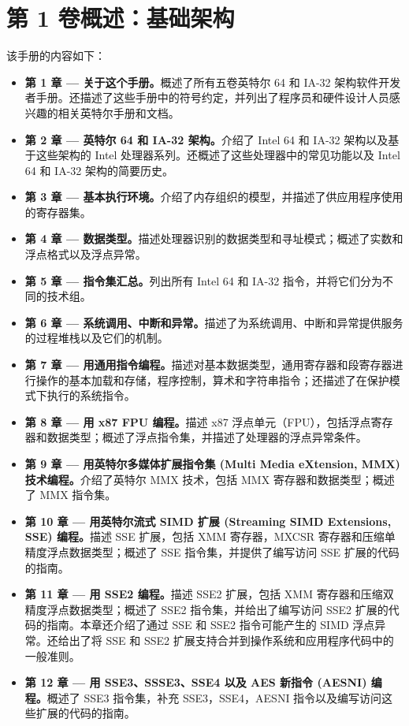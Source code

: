 \section{第 1 卷概述：基础架构}
该手册的内容如下：
\begin{itemize}
	\setlength\itemsep{-0.3em}
	\item \textbf{第 1 章 — 关于这个手册。}概述了所有五卷英特尔 64 和 IA-32 架构软件开发者手册。还描述了这些手册中的符号约定，并列出了程序员和硬件设计人员感兴趣的相关英特尔手册和文档。
	\item \textbf{第 2 章 — 英特尔 64 和 IA-32 架构。}介绍了 Intel 64 和 IA-32 架构以及基于这些架构的 Intel 处理器系列。还概述了这些处理器中的常见功能以及 Intel 64 和 IA-32 架构的简要历史。
	\item \textbf{第 3 章 — 基本执行环境。}介绍了内存组织的模型，并描述了供应用程序使用的寄存器集。
	\item \textbf{第 4 章 — 数据类型。}描述处理器识别的数据类型和寻址模式；概述了实数和浮点格式以及浮点异常。
	\item \textbf{第 5 章 — 指令集汇总。}列出所有 Intel 64 和 IA-32 指令，并将它们分为不同的技术组。
	\item \textbf{第 6 章 — 系统调用、中断和异常。}描述了为系统调用、中断和异常提供服务的过程堆栈以及它们的机制。
	\item \textbf{第 7 章 — 用通用指令编程。}描述对基本数据类型，通用寄存器和段寄存器进行操作的基本加载和存储，程序控制，算术和字符串指令；还描述了在保护模式下执行的系统指令。
	\item \textbf{第 8 章 — 用 x87 FPU 编程。}描述 x87 浮点单元（FPU），包括浮点寄存器和数据类型；概述了浮点指令集，并描述了处理器的浮点异常条件。
	\item \textbf{第 9 章 — 用英特尔多媒体扩展指令集 (Multi Media eXtension, MMX) 技术编程。}介绍了英特尔 MMX 技术，包括 MMX 寄存器和数据类型；概述了 MMX 指令集。
	\item \textbf{第 10 章 — 用英特尔流式 SIMD 扩展 (Streaming SIMD Extensions, SSE) 编程。}描述 SSE 扩展，包括 XMM 寄存器，MXCSR 寄存器和压缩单精度浮点数据类型；概述了 SSE 指令集，并提供了编写访问 SSE 扩展的代码的指南。
	\item \textbf{第 11 章 — 用 SSE2 编程。}描述 SSE2 扩展，包括 XMM 寄存器和压缩双精度浮点数据类型；概述了 SSE2 指令集，并给出了编写访问 SSE2 扩展的代码的指南。本章还介绍了通过 SSE 和 SSE2 指令可能产生的 SIMD 浮点异常。还给出了将 SSE 和 SSE2 扩展支持合并到操作系统和应用程序代码中的一般准则。
	\item \textbf{第 12 章 — 用 SSE3、SSSE3、SSE4 以及 AES 新指令 (AESNI) 编程。}概述了 SSE3 指令集，补充 SSE3，SSE4，AESNI 指令以及编写访问这些扩展的代码的指南。

\end{itemize}
